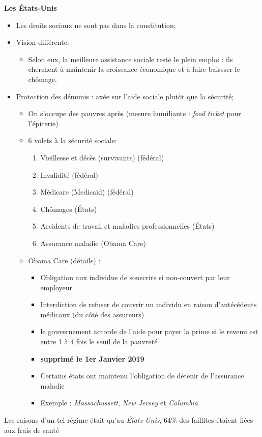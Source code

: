 \documentclass[10pt, french]{article}
\begin{document}
\begin{multicols*}{3}
\textbf{Les États-Unis}

\begin{itemize}[leftmargin = *]
	\item	Les droits sociaux ne sont pas dans la constitution;
	\item Vision différente:
	  \begin{itemize}
	  \item Selon eux, la meilleure assistance sociale reste le plein emploi : ils cherchent à maintenir la croissance économique et à faire baissser le chômage.
	  \end{itemize}
	\item Protection des démunis : axée sur l'aide sociale plutôt que la sécurité;
	  \begin{itemize}
	  \item On s'occupe des pauvres après (mesure humiliante : \textit{food ticket} pour l'épicerie)
	  \item 6 volets à la sécurité sociale:
	  \begin{enumerate}
	    \item Vieillesse et décès (survivants) (\textcolor{bulgarianrose}{fédéral})
	    \item Invalidité (\textcolor{bulgarianrose}{fédéral})
	    \item Médicare (Medicaid) (\textcolor{bulgarianrose}{fédéral})
	    \item Chômages (États)
	    \item Accidents de travail et maladies professionnelles (États)
	    \item Assurance maladie (Obama Care)
	  \end{enumerate}
	\item Obama Care (détails) : 
	  \begin{itemize}
	    \item Obligation aux individus de souscrire si non-couvert par leur employeur
	    \item Interdiction de refuser de couvrir un individu en raison d'antécédents médicaux (du côté des assureurs)
	    \item le gouvernement accorde de l'aide pour payer la prime si le revenu est entre 1 à 4 fois le seuil de la pauvreté
	    \item \textbf{supprimé le 1er Janvier 2019 }
	    \item Certains états ont maintenu l'obligation de détenir de l'assurance maladie
	    \item[] Exemple : \textit{Massachussett}, \textit{New Jersey} et \textit{Columbia}
	 \end{itemize}
	 \end{itemize}
	 \end{itemize}
 Les raisons d'un tel régime était qu'au \textit{États-Unis}, 64\% des faillites étaient liées aux frais de santé
\newpage


\end{multicols*}
\end{document}
